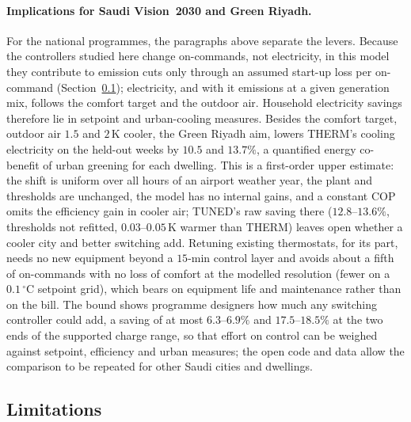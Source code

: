 \documentclass[3p,twocolumn,number]{elsarticle}
\begin{document}
\paragraph{Implications for Saudi Vision~2030 and Green Riyadh.}
For the national programmes, the paragraphs above separate the levers. Because the controllers studied here change on-commands, not electricity, in this model they contribute to emission cuts only through an assumed start-up loss per on-command (Section~\ref{subsec:limits}); electricity, and with it emissions at a given generation mix, follows the comfort target and the outdoor air. Household electricity savings therefore lie in setpoint and urban-cooling measures. Besides the comfort target, outdoor air $1.5$ and $2\,$K cooler, the Green Riyadh aim, lowers THERM's cooling electricity on the held-out weeks by $10.5$ and $13.7\%$, a quantified energy co-benefit of urban greening for each dwelling. This is a first-order upper estimate: the shift is uniform over all hours of an airport weather year, the plant and thresholds are unchanged, the model has no internal gains, and a constant COP omits the efficiency gain in cooler air; TUNED's raw saving there ($12.8$--$13.6\%$, thresholds not refitted, $0.03$--$0.05\,$K warmer than THERM) leaves open whether a cooler city and better switching add. Retuning existing thermostats, for its part, needs no new equipment beyond a $15$-min control layer and avoids about a fifth of on-commands with no loss of comfort at the modelled resolution (fewer on a $0.1\,^\circ$C setpoint grid), which bears on equipment life and maintenance rather than on the bill. The bound shows programme designers how much any switching controller could add, a saving of at most $6.3$--$6.9\%$ and $17.5$--$18.5\%$ at the two ends of the supported charge range, so that effort on control can be weighed against setpoint, efficiency and urban measures; the open code and data allow the comparison to be repeated for other Saudi cities and dwellings.

\subsection{Limitations}
\label{subsec:limits}
\label{subsec:disc_limits}
\end{document}
